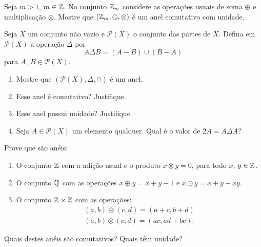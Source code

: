 \documentclass[12pt]{exam}
\begin{document}
    \vspace{.3cm}

    \questao{} Seja $m > 1$, $m \in \mathbb{Z}$. No conjunto $\mathbb{Z}_m$ considere as operações usuais de soma $\oplus$ e multiplicação $\otimes$. Mostre que $(\mathbb{Z}_m, \oplus, \otimes)$ é um anel comutativo com unidade.

    \vspace{.3cm}

    \questao{} Seja $X$ um conjunto não vazio e $\mathcal{P}(X)$ o conjunto das partes de $X$. Defina em $\mathcal{P}(X)$ a operação $\Delta$ por
    \[
        A \Delta B = (A - B) \cup (B - A)
    \]
    para $A$, $B \in \mathcal{P}(X)$.
    \begin{enumerate}[label={\alph*})]
        \item Mostre que $(\mathcal{P}(X), \Delta, \cap)$ é um anel.

        \item Esse anel é comutativo? Justifique.

        \item Esse anel possui unidade? Justifique.

        \item Seja $A \in \mathcal{P}(X)$ um elemento qualquer. Qual é o valor de $2A = A \Delta A$?
    \end{enumerate}

    \vspace{.3cm}

    \questao{} Prove que são anéis:
    \begin{enumerate}[label={\alph*})]
        \item O conjunto $\mathbb{Z}$ com a adição usual e o produto $x \otimes y = 0$, para todo $x$, $y \in \mathbb{Z}$.
        \item O conjunto $\mathbb{Q}$ com as operações $x \oplus y = x + y - 1$ e $x \odot y = x + y - xy$.
        \item O conjunto $\mathbb{Z} \times \mathbb{Z}$ com as operações:
        \begin{align*}
            (a, b) \oplus (c, d) = (a + c, b + d)\\
            (a ,b) \otimes (c, d) = (ac, ad + bc).
        \end{align*}
    \end{enumerate}
    Quais destes anéis são comutativos? Quais t\^em unidade?

    \vspace{.3cm}
\end{document}
